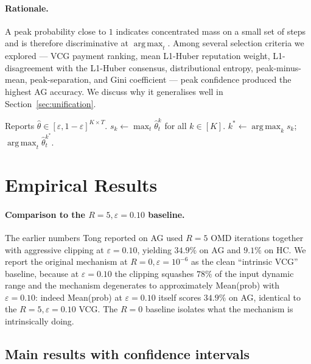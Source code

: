 \documentclass[11pt]{article}
\DeclareMathOperator*{\argmax}{arg\,max}
\newcommand{\thetahat}{\hat{\theta}}
\begin{document}
\paragraph{Rationale.} A peak probability close to $1$ indicates concentrated
mass on a small set of steps and is therefore discriminative at $\argmax_t$.
Among several selection criteria we explored --- VCG payment ranking, mean
L1-Huber reputation weight, L1-disagreement with the L1-Huber consensus,
distributional entropy, peak-minus-mean, peak-separation, and Gini
coefficient --- peak confidence produced the highest AG accuracy. We
discuss why it generalises well in Section~\ref{sec:unification}.

\begin{algorithm}[H]
\caption{Confidence-Based VCG Selection}
\label{alg:select}
\begin{algorithmic}[1]
\Require Reports $\thetahat \in [\varepsilon, 1{-}\varepsilon]^{K \times T}$.
\State $s_k \gets \max_t \thetahat^k_t$ for all $k \in [K]$.
\State $k^* \gets \argmax_k s_k$; \Return $\argmax_t \thetahat^{k^*}_t$.
\end{algorithmic}
\end{algorithm}

\section{Empirical Results}
\label{sec:results}

\paragraph{Comparison to the $R = 5, \varepsilon = 0.10$ baseline.}
The earlier numbers Tong reported on AG used $R = 5$ OMD iterations
together with aggressive clipping at $\varepsilon = 0.10$, yielding
$34.9\%$ on AG and $9.1\%$ on HC. We report the original mechanism at
$R = 0, \varepsilon = 10^{-6}$ as the clean ``intrinsic VCG'' baseline,
because at $\varepsilon = 0.10$ the clipping squashes $78\%$ of the
input dynamic range and the mechanism degenerates to approximately
Mean(prob) with $\varepsilon = 0.10$: indeed Mean(prob) at $\varepsilon = 0.10$
itself scores $34.9\%$ on AG, identical to the $R = 5, \varepsilon = 0.10$
VCG. The $R = 0$ baseline isolates what the mechanism is intrinsically
doing.

\subsection{Main results with confidence intervals}
\end{document}
